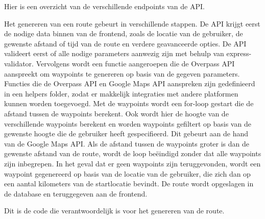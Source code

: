     Hier is een overzicht van de verschillende endpoints van de API.
    
    Het genereren van een route gebeurt in verschillende stappen. 
    De API krijgt eerst de nodige data binnen van de frontend, zoals de locatie van de gebruiker, de gewenste afstand of tijd van de route en verdere geavanceerde opties. 
    De API valideert eerst of alle nodige parameters aanwezig zijn met behulp van express-validator. 
    Vervolgens wordt een functie aangeroepen die de Overpass API aanspreekt om waypoints te genereren op basis van de gegeven parameters. 
    Functies die de Overpass API en Google Maps API aanspreken zijn gedefinieerd in een helpers folder, zodat er makkelijk integraties met andere platformen kunnen worden toegevoegd. 
    Met de waypoints wordt een for-loop gestart die de afstand tussen de waypoints berekent. Ook wordt hier de hoogte van de verschillende waypoints berekent en worden waypoints gefiltert 
    op basis van de gewenste hoogte die de gebruiker heeft gespecifieerd. Dit gebeurt aan de hand van de Google Maps API.
    Als de afstand tussen de waypoints groter is dan de gewenste afstand van de route,
    wordt de loop beëindigd zonder dat alle waypoints zijn inbegrepen. 
    In het geval dat er geen waypoints zijn teruggevonden, wordt een waypoint gegenereerd op basis van de locatie van de gebruiker, die zich dan op een aantal kilometers van de startlocatie bevindt. 
    De route wordt opgeslagen in de database en teruggegeven aan de frontend.

    \pagebreak

Dit is de code die verantwoordelijk is voor het genereren van de route.

